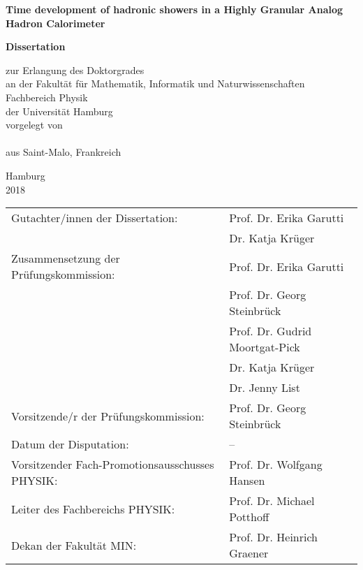 \begin{titlepage}

  \thispagestyle{empty}
  \begin{center}

    {\huge \bf Time development of hadronic showers in a Highly Granular Analog Hadron Calorimeter\\}

    \vspace{3cm}

    {\LARGE \bf Dissertation\\}

    \vspace{0.5cm}
    {\Large
    zur Erlangung des Doktorgrades\\
    an der Fakult\"{a}t f\"ur Mathematik, Informatik und Naturwissenschaften\\
    Fachbereich Physik\\
    der Universit\"{a}t Hamburg\\
    \vspace{2.5cm}
    vorgelegt von\\
    \makeatletter
    \textsc{\@author}\\
    \makeatother
    aus Saint-Malo, Frankreich\\

    \vfill

    Hamburg\\
    2018\\
    }

    \newpage
    \thispagestyle{empty}
    \null
    \vfill
    \begin{tabular}{ll}
      Gutachter/innen der Dissertation: & Prof. Dr. Erika Garutti\\
      & Dr. Katja Kr\"uger\\[3mm]
      Zusammensetzung der Pr\"ufungskommission: & Prof. Dr. Erika Garutti\\
      & Prof. Dr. Georg Steinbr\"uck\\
      & Prof. Dr. Gudrid Moortgat-Pick\\
      & Dr. Katja Kr\"uger\\
      & Dr. Jenny List\\[3mm]
      Vorsitzende/r der Pr\"ufungskommission: & Prof. Dr. Georg Steinbr\"uck\\[3mm]
      Datum der Disputation: & --\\[3mm]
      Vorsitzender Fach-Promotionsausschusses PHYSIK: & Prof. Dr. Wolfgang Hansen\\[3mm]
      Leiter des Fachbereichs PHYSIK: & Prof. Dr. Michael Potthoff\\[3mm]
      Dekan der Fakult\"at MIN: & Prof. Dr. Heinrich Graener\\[3mm]
    \end{tabular}

  \end{center}
\end{titlepage}
